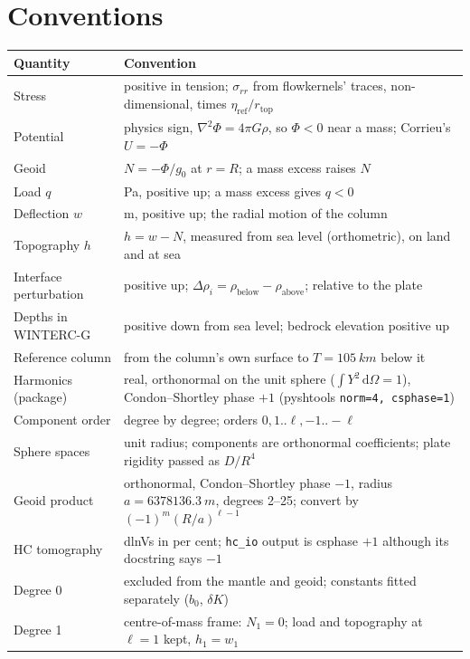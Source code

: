 \chapter{Conventions}
\label{app:conventions}

\begin{center}
\small
\begin{longtable}{p{}p{}}
\toprule
Quantity & Convention\\
\midrule
\endhead
Stress & positive in tension; $\sigma_{rr}$ from flowkernels' traces, non-dimensional, times $\eta_{\mathrm{ref}}/r_{\mathrm{top}}$\\
Potential & physics sign, $\nabla^2\Phi = 4\pi G\rho$, so $\Phi<0$ near a mass; Corrieu's $U = -\Phi$\\
Geoid & $N = -\Phi/g_0$ at $r=R$; a mass excess raises $N$\\
Load $q$ & \si{Pa}, positive up; a mass excess gives $q<0$\\
Deflection $w$ & m, positive up; the radial motion of the column\\
Topography $h$ & $h = w - N$, measured from sea level (orthometric), on land and at sea\\
Interface perturbation & positive up; $\Delta\rho_i = \rho_{\mathrm{below}} - \rho_{\mathrm{above}}$; relative to the plate\\
Depths in WINTERC-G & positive down from sea level; bedrock elevation positive up\\
Reference column & from the column's own surface to $T=\qty{105}{km}$ below it\\
Harmonics (package) & real, orthonormal on the unit sphere ($\int Y^2\,\mathrm d\Omega = 1$), Condon--Shortley phase $+1$ (pyshtools \texttt{norm=4, csphase=1})\\
Component order & degree by degree; orders $0, 1..\ell, -1..-\ell$\\
Sphere spaces & unit radius; components are orthonormal coefficients; plate rigidity passed as $D/R^4$\\
Geoid product & orthonormal, Condon--Shortley phase $-1$, radius $a = \qty{6378136.3}{m}$, degrees 2--25; convert by $(-1)^m (R/a)^{\ell-1}$\\
HC tomography & dlnVs in per cent; \texttt{hc\_io} output is csphase $+1$ although its docstring says $-1$\\
Degree 0 & excluded from the mantle and geoid; constants fitted separately ($b_0$, $\delta K$)\\
Degree 1 & centre-of-mass frame: $N_1=0$; load and topography at $\ell=1$ kept, $h_1=w_1$\\

\end{longtable}
\end{center}
